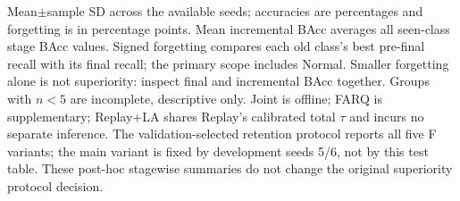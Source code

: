 \begin{table}[t]
\par\smallskip\begin{minipage}{0.98\textwidth}\scriptsize Mean$\pm$sample SD across the available seeds; accuracies are percentages and forgetting is in percentage points. Mean incremental BAcc averages all seen-class stage BAcc values. Signed forgetting compares each old class's best pre-final recall with its final recall; the primary scope includes Normal. Smaller forgetting alone is not superiority: inspect final and incremental BAcc together. Groups with $n<5$ are incomplete, descriptive only. Joint is offline; FARQ is supplementary; Replay+LA shares Replay's calibrated total $\tau$ and incurs no separate inference. The validation-selected retention protocol reports all five F variants; the main variant is fixed by development seeds 5/6, not by this test table. These post-hoc stagewise summaries do not change the original superiority protocol decision.\end{minipage}
\end{table}
